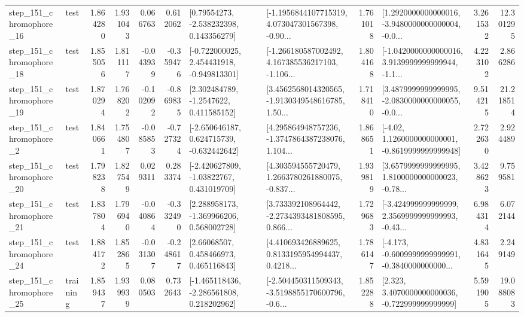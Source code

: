 \begin{tabular}{llrrrrllrlrr}
  step\_151\_chromophore\_16 &      test &      1.864280 &    1.931043 &      0.066763 &  0.612062 &     [0.79554273, -2.538232398, 0.143356279] &  [-1.1956844107715319, 4.073047301567398, -0.90... &       1.761018 &  [1.2920000000000016, -3.9480000000000004, -0.0... &            3.261532 &         12.301295 \\
  step\_151\_chromophore\_18 &      test &      1.855056 &    1.811117 &     -0.043939 & -0.359476 &   [-0.722000025, 2.454431918, -0.949813301] &  [-1.266180587002492, 4.167385536217103, -1.106... &       1.804168 &  [-1.0420000000000016, 3.9139999999999944, -1.1... &            4.223102 &          2.866286 \\
  step\_151\_chromophore\_19 &      test &      1.870294 &    1.768202 &     -0.102092 & -0.869835 &      [2.302484789, -1.2547622, 0.411585152] &  [3.4562568014320565, -1.9130349548616785, 1.50... &       1.718410 &  [3.4879999999999995, -2.0830000000000055, -0.0... &            9.514215 &         21.218514 \\
   step\_151\_chromophore\_2 &      test &      1.840661 &    1.754807 &     -0.085853 & -0.727324 &   [-2.650646187, 0.624715739, -0.632442642] &  [4.295864948757236, -1.3747864387238076, 1.104... &       1.868651 &   [-4.02, 1.1260000000000001, -0.8619999999999948] &            2.722630 &          2.924489 \\
  step\_151\_chromophore\_20 &      test &      1.798238 &    1.827549 &      0.029311 &  0.283374 &    [-2.420627809, -1.03822767, 0.431019709] &  [4.303594555720479, 1.2663780261880075, -0.837... &       1.939819 &  [3.6579999999999995, 1.8100000000000023, -0.78... &            3.428623 &          9.759581 \\
  step\_151\_chromophore\_21 &      test &      1.837804 &    1.796940 &     -0.040864 & -0.332490 &    [2.288958173, -1.369966206, 0.568002728] &  [3.733392108964442, -2.2734393481808595, 0.866... &       1.729683 &  [-3.424999999999999, 2.3569999999999993, -0.43... &            6.984314 &          6.072144 \\
  step\_151\_chromophore\_24 &      test &      1.884172 &    1.852865 &     -0.031307 & -0.248617 &      [2.66068507, 0.458466973, 0.465116843] &  [4.410693426889625, 0.8133195954994437, 0.4218... &       1.786147 &  [-4.173, -0.6009999999999991, -0.3840000000000... &            4.831645 &          2.249149 \\
  step\_151\_chromophore\_25 &  training &      1.859437 &    1.939939 &      0.080503 &  0.732643 &   [-1.465118436, -2.286561808, 0.218202962] &  [-2.504450311509343, -3.5198855170600796, -0.6... &       1.852288 &    [2.323, 3.4070000000000036, -0.722999999999999] &            5.591905 &         19.088083 \\

\end{tabular}
